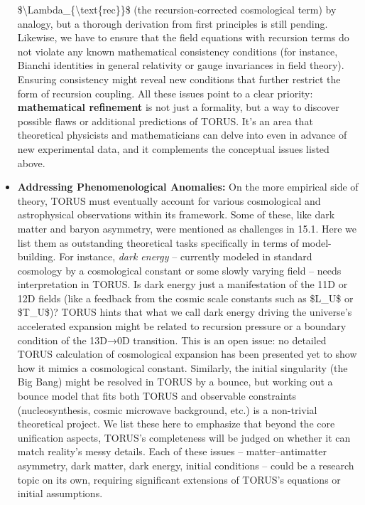 \documentclass[
]{article}
\begin{document}
\begin{itemize}
  \$\textbackslash Lambda\_\{\textbackslash text\{rec\}\}\$ (the
  recursion-corrected cosmological term) by analogy, but a thorough
  derivation from first principles is still pending. Likewise, we have
  to ensure that the field equations with recursion terms do not violate
  any known mathematical consistency conditions (for instance, Bianchi
  identities in general relativity or gauge invariances in field
  theory). Ensuring consistency might reveal new conditions that further
  restrict the form of recursion coupling. All these issues point to a
  clear priority: \textbf{mathematical refinement} is not just a
  formality, but a way to discover possible flaws or additional
  predictions of TORUS. It's an area that theoretical physicists and
  mathematicians can delve into even in advance of new experimental
  data, and it complements the conceptual issues listed above.
\item
  \textbf{Addressing Phenomenological Anomalies:} On the more empirical
  side of theory, TORUS must eventually account for various cosmological
  and astrophysical observations within its framework. Some of these,
  like dark matter and baryon asymmetry, were mentioned as challenges in
  15.1. Here we list them as outstanding theoretical tasks specifically
  in terms of model-building. For instance, \emph{dark energy} --
  currently modeled in standard cosmology by a cosmological constant or
  some slowly varying field -- needs interpretation in TORUS. Is dark
  energy just a manifestation of the 11D or 12D fields (like a feedback
  from the cosmic scale constants such as \$L\_U\$ or \$T\_U\$)? TORUS
  hints that what we call dark energy driving the universe's accelerated
  expansion might be related to recursion pressure or a boundary
  condition of the 13D→0D transition. This is an open issue: no detailed
  TORUS calculation of cosmological expansion has been presented yet to
  show how it mimics a cosmological constant. Similarly, the initial
  singularity (the Big Bang) might be resolved in TORUS by a bounce, but
  working out a bounce model that fits both TORUS and observable
  constraints (nucleosynthesis, cosmic microwave background, etc.) is a
  non-trivial theoretical project. We list these here to emphasize that
  beyond the core unification aspects, TORUS's completeness will be
  judged on whether it can match reality's messy details. Each of these
  issues -- matter--antimatter asymmetry, dark matter, dark energy,
  initial conditions -- could be a research topic on its own, requiring
  significant extensions of TORUS's equations or initial assumptions.

\end{itemize}
\end{document}
